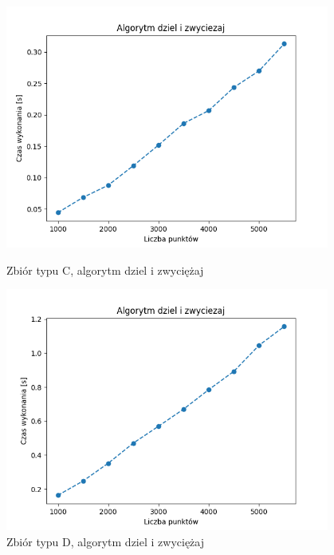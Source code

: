 \documentclass[11pt]{article}
\theoremstyle{remark} \newtheorem{definition}{def.}
\theoremstyle{definition} \newtheorem{twierdzenie}{tw.}
\begin{document}
\begin{figure}[]
    \centering
    \begin{minipage}{0.48\textwidth}
        \centering
        \includegraphics[width=0.95\textwidth]{../tests/prost-dziel.png} %
        \caption{Zbiór typu C, algorytm dziel i zwyciężaj}
        \label{fig:prost-dziel}
    \end{minipage}\hfill
    \begin{minipage}{0.48\textwidth}
        \centering
        \includegraphics[width=0.95\textwidth]{../tests/kw-dziel.png} %
        \caption{Zbiór typu D, algorytm dziel i zwyciężaj}
        \label{fig:kw-dziel}
    \end{minipage}
\end{figure}
\end{document}
